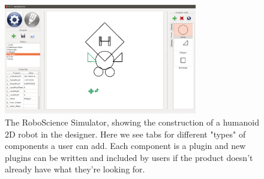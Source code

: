 \begin{figure}[!htb]
	\begin{center}
		\includegraphics[width=0.75\textwidth]{./Images/designer_weird_robot}
	\end{center}
	\caption{The RoboScience Simulator, showing the construction of a humanoid 2D robot in the designer. Here we see tabs for different "types" of components a user can add. Each component is a plugin and new plugins can be written and included by users if the product doesn't already have what they're looking for. \label{mvp}}
\end{figure}